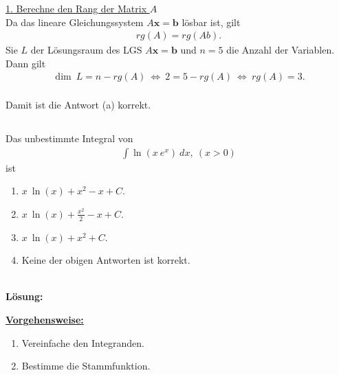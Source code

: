 \underline{1. Berechne den Rang der Matrix $ A $}\\
Da das lineare Gleichungssystem $ A \textbf{x} = \textbf{b} $ lösbar ist, gilt
\begin{align*}
rg(A) = rg(Ab).
\end{align*}
Sie $ L $ der Lösungsraum des LGS $ A \textbf{x} = \textbf{b} $ und $ n = 5 $ die Anzahl der Variablen. Dann gilt
\begin{align*}
\dim \ L = n - rg(A)
\ \Leftrightarrow \
2 = 5 - rg(A)
\ \Leftrightarrow \
rg(A) = 3.
\end{align*}
\ \\
Damit ist die Antwort (a) korrekt.
\newpage
\subsection*{}
Das unbestimmte Integral von
\begin{align*}
\int \ln(x \ e^x ) \ dx, \ (x > 0)
\end{align*}
ist
\renewcommand{\labelenumi}{(\alph{enumi})}
\begin{enumerate}
	\item 
	$ x \ \ln(x) + x^2 - x + C $.
	\item
	$ x \ \ln(x) + \frac{x^2}{2} - x + C $.
	\item
	$ x \ \ln(x) + x^2  + C $.
	\item
	Keine der obigen Antworten ist korrekt.
\end{enumerate}
\ \\
\textbf{Lösung:}
\begin{mdframed}
\underline{\textbf{Vorgehensweise:}}
\renewcommand{\labelenumi}{\theenumi.}
\begin{enumerate}
\item Vereinfache den Integranden.
\item Bestimme die Stammfunktion.
\end{enumerate}
\end{mdframed}

